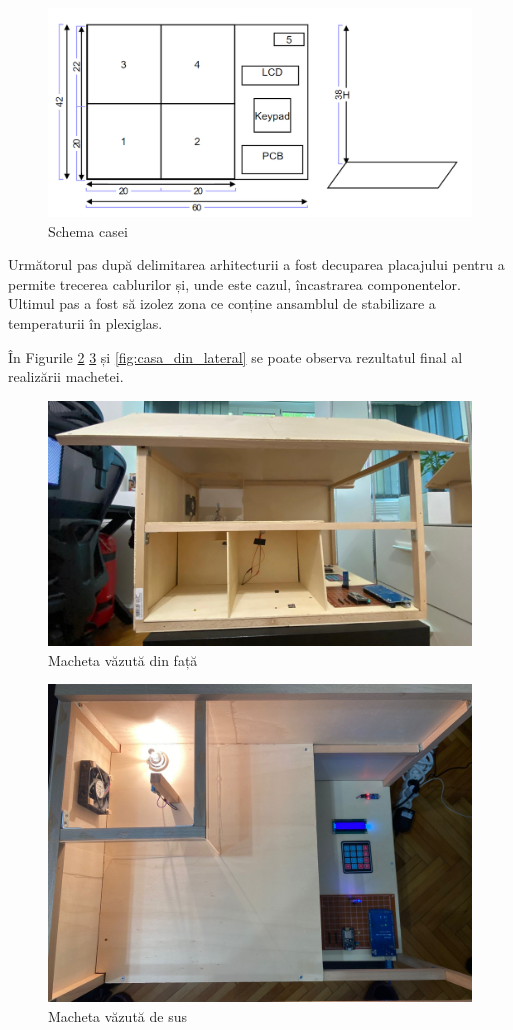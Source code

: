 \begin{figure}[H]
    \centering
    \includegraphics[width=0.8\linewidth]{bachelors_ro/images/schema_casa.png}
    \caption{Schema casei}
    \label{fig:schema_casa}
\end{figure}

Următorul pas după delimitarea arhitecturii a fost decuparea placajului pentru a permite trecerea cablurilor și, unde este cazul, încastrarea componentelor. Ultimul pas a fost să izolez zona ce conține ansamblul de stabilizare a temperaturii în plexiglas. 

În Figurile \ref{fig:casa_din_fata} \ref{fig:casa_de_sus} și \ref{fig:casa_din_lateral} se poate observa rezultatul final al realizării machetei.

\begin{figure}[H]
\includegraphics[width=0.6\linewidth]{bachelors_ro/images/casa_din_fata.jpg}
\caption{Macheta văzută din față}
\label{fig:casa_din_fata}
\end{figure}

\begin{figure}[H]
\includegraphics[width=0.6\linewidth]{bachelors_ro/images/casa_de_sus.jpg}
\caption{Macheta văzută de sus}
\label{fig:casa_de_sus}
\end{figure}

